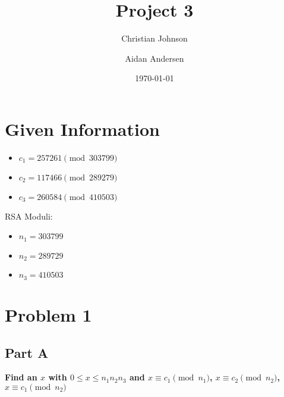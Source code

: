 \documentclass[11pt]{article}
\author{Christian Johnson \and Aidan Andersen}
\date{\today}
\title{Project 3}
\begin{document}
\maketitle
\tableofcontents

\newpage

\section{Given Information}
\label{sec:org3fcd01f}
\begin{itemize}
\item \(c_1=257261 \pmod{303799}\)
\item \(c_2 = 117466\pmod{289279}\)
\item \(c_3=260584\pmod{410503}\)
\end{itemize}

RSA Moduli:
\begin{itemize}
\item \(n_1=303799\)
\item \(n_2=289729\)
\item \(n_3=410503\)
\end{itemize}


\section{Problem 1}
\label{sec:orgdcba4a9}
\subsection{Part A}
\label{sec:orga0e1f13}
\textbf{Find an \(x\) with \(0\le x\le n_{1}n_{2}n_{3}\) and \(x\equiv c_{1}\pmod{n_1}\), \(x\equiv c_{2}\pmod{n_2}\), \(x\equiv c_{1}\pmod{n_2}\)}
\end{document}
